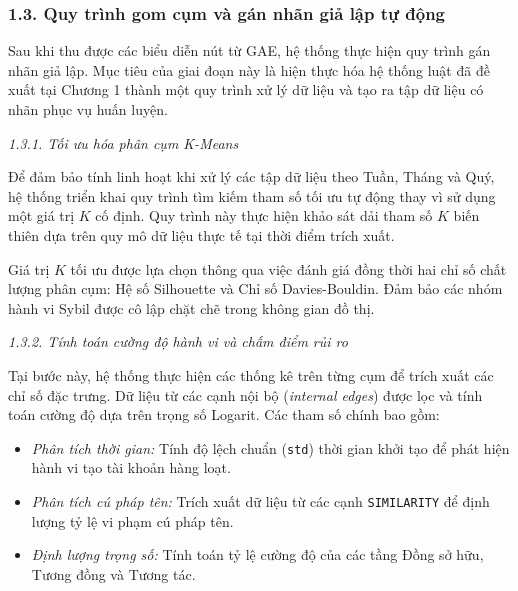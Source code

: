 \subsubsection{1.3. Quy trình gom cụm và gán nhãn giả lập tự động}\vspace{0.2cm}

\indent\indent Sau khi thu được các biểu diễn nút từ GAE, hệ thống thực hiện quy trình gán nhãn giả lập. Mục tiêu của giai đoạn này là hiện thực hóa hệ thống luật đã đề xuất tại Chương 1 thành một quy trình xử lý dữ liệu và tạo ra tập dữ liệu có nhãn phục vụ huấn luyện.\vspace{0.3cm}



\textit{1.3.1. Tối ưu hóa phân cụm K-Means}\vspace{0.2cm}

Để đảm bảo tính linh hoạt khi xử lý các tập dữ liệu theo Tuần, Tháng và Quý, hệ thống triển khai quy trình tìm kiếm tham số tối ưu tự động thay vì sử dụng một giá trị $K$ cố định. Quy trình này thực hiện khảo sát dải tham số $K$ biến thiên dựa trên quy mô dữ liệu thực tế tại thời điểm trích xuất.\vspace{0.3cm}

Giá trị $K$ tối ưu được lựa chọn thông qua việc đánh giá đồng thời hai chỉ số chất lượng phân cụm: Hệ số Silhouette và Chỉ số Davies-Bouldin. Đảm bảo các nhóm hành vi Sybil được cô lập chặt chẽ trong không gian đồ thị.\vspace{0.3cm}

\textit{1.3.2. Tính toán cường độ hành vi và chấm điểm rủi ro}\vspace{0.2cm}

Tại bước này, hệ thống thực hiện các thống kê trên từng cụm để trích xuất các chỉ số đặc trưng. Dữ liệu từ các cạnh nội bộ (\textit{internal edges}) được lọc và tính toán cường độ dựa trên trọng số Logarit. Các tham số chính bao gồm:
\begin{itemize}[label={--}, itemsep=2pt]
    \item \textit{Phân tích thời gian:} Tính độ lệch chuẩn (\texttt{std}) thời gian khởi tạo để phát hiện hành vi tạo tài khoản hàng loạt.
    \item \textit{Phân tích cú pháp tên:} Trích xuất dữ liệu từ các cạnh \texttt{SIMILARITY} để định lượng tỷ lệ vi phạm cú pháp tên.
    \item \textit{Định lượng trọng số:} Tính toán tỷ lệ cường độ của các tầng Đồng sở hữu, Tương đồng và Tương tác.
\end{itemize}


